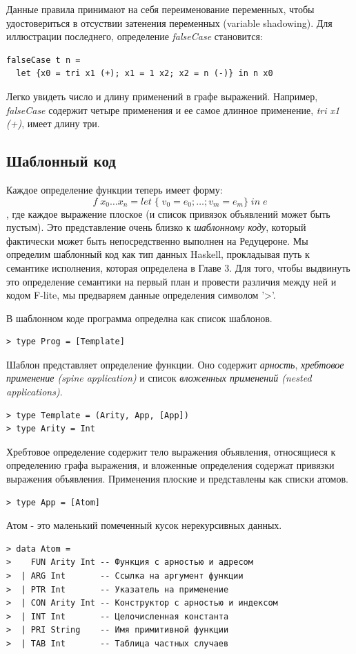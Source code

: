\documentclass[flenqn, 14pt]{extarticle}
\begin{document}
Данные правила принимают на себя переименование переменных, чтобы удостовериться в отсуствии затенения переменных (variable shadowing). Для иллюстрации последнего, определение \textit{falseCase} становится:
\begin{verbatim}
falseCase t n =
  let {x0 = tri x1 (+); x1 = 1 x2; x2 = n (-)} in n x0
\end{verbatim}

Легко увидеть число и длину применений в графе выражений. Например, \textit{falseCase} содержит четыре применения и ее самое длинное применение, \textit{tri x1 (+)}, имеет длину три.

\subsection{Шаблонный код}
Каждое определение функции теперь имеет форму:
$$
f \; x_0 \ldots x_n = let \; \{ \; v_0 = e_0; \ldots ; v_m = e_m \} \; in \; e
$$
, где каждое выражение плоское (и список привязок объявлений может быть пустым). Это представление очень близко к \textit{шаблонному коду}, который фактически может быть непосредственно выполнен на Редуцероне. Мы определим шаблонный код как тип данных Haskell, прокладывая путь к семантике исполнения, которая определена в Главе 3. Для того, чтобы выдвинуть это определение семантики на первый план и провести различия между ней и кодом F-lite, мы предваряем данные определения символом '>'.

В шаблонном коде программа определна как список шаблонов.
\begin{verbatim}
> type Prog = [Template]
\end{verbatim}

Шаблон представляет определение функции. Оно содержит \textit{арность}, \textit{хребтовое применение (spine application)} и список \textit{вложенных применений (nested applications)}.
\begin{verbatim}
> type Template = (Arity, App, [App])
> type Arity = Int
\end{verbatim}

Хребтовое определение содержит тело выражения объявления, относящиеся к определению графа выражения, и вложенные определения содержат привязки выражения объявления. Применения плоские и представлены как списки атомов. 
\begin{verbatim}
> type App = [Atom]
\end{verbatim}

Атом - это маленький помеченный кусок нерекурсивных данных.
\begin{verbatim}
> data Atom =
>    FUN Arity Int -- Функция с арностью и адресом
>  | ARG Int       -- Ссылка на аргумент функции
>  | PTR Int       -- Указатель на применение
>  | CON Arity Int -- Конструктор с арностью и индексом
>  | INT Int       -- Целочисленная константа
>  | PRI String    -- Имя примитивной функции
>  | TAB Int       -- Таблица частных случаев
\end{verbatim}
\end{document}
